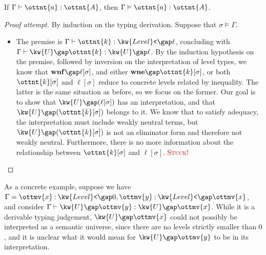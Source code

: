 \documentclass[a4paper,UKenglish,cleveref,autoref,thm-restate]{lipics-v2021}
\begin{document}
\begin{claim}[Soundness]
  If $ \Gamma  \vdash  \ottnt{a}  \mathrel{:}  \ottnt{A} $, then $ \Gamma  \vDash  \ottnt{a}  :  \ottnt{A} $.
\end{claim}

\begin{proof}[Proof attempt]
  By induction on the typing derivation.
  Suppose that $ \sigma  \vDash  \Gamma $.
  \begin{itemize}[topsep=0pt]
    \item \textit{}
      The premise is $ \Gamma  \vdash  \ottnt{k}  \mathrel{:}   \kw{Level}\texttt{<} \gap  \ell  $,
      concluding with $ \Gamma  \vdash   \kw{U} \gap  \ottnt{k}   \mathrel{:}   \kw{U} \gap  \ell  $.
      By the induction hypothesis on the premise,
      followed by inversion on the interpretation of level types,
      we know that $ \mathbf{wnf} \gap   \ell [  \sigma  ]  $, and either $ \mathbf{wne} \gap   \ottnt{k} [  \sigma  ]  $,
      or both $ \ottnt{k} [  \sigma  ] $ and $ \ell [  \sigma  ] $ reduce to concrete levels related by inequality.
      The latter is the same situation as before,
      so we focus on the former.
      Our goal is to show that $ \kw{U} \gap   (  \ell [  \sigma  ]  )  $ has an interpretation,
      and that $ \kw{U} \gap   (  \ottnt{k} [  \sigma  ]  )  $ belongs to it.
      We know that to satisfy adequacy,
      the interpretation must include weakly neutral terms,
      but $ \kw{U} \gap   (  \ottnt{k} [  \sigma  ]  )  $ is not an eliminator form and therefore not weakly neutral.
      Furthermore, there is no more information about the relationship
      between $ \ottnt{k} [  \sigma  ] $ and $ \ell [  \sigma  ] $.
      \textcolor{red}{\textsc{Stuck!}} \qedhere
  \end{itemize}
\end{proof}

As a concrete example,
suppose we have $\Gamma =   \ottmv{x}  \mathbin{:}   \kw{Level}\texttt{<} \gap   0    ,  \ottmv{y}  \mathbin{:}   \kw{Level}\texttt{<} \gap  \ottmv{x}  $,
and consider $ \Gamma  \vdash   \kw{U} \gap  \ottmv{y}   \mathrel{:}   \kw{U} \gap  \ottmv{x}  $.
While it is a derivable typing judgement,
$ \kw{U} \gap  \ottmv{x} $ could not possibly be interpreted as a semantic universe,
since there are no levels strictly smaller than $0$,
and it is unclear what it would mean for $ \kw{U} \gap  \ottmv{y} $ to be in its interpretation.
\end{document}
